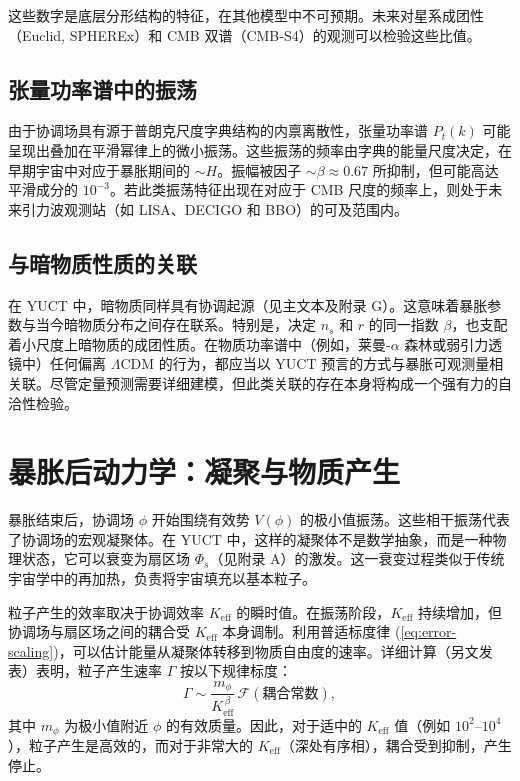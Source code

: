 \documentclass[11pt,a4paper]{article}
\newcommand{\Keff}{K_{\mathrm{eff}}}
\begin{document}
	这些数字是底层分形结构的特征，在其他模型中不可预期。未来对星系成团性（Euclid, SPHEREx）和 CMB 双谱（CMB‑S4）的观测可以检验这些比值。
	
	\subsection{张量功率谱中的振荡}
	
	由于协调场具有源于普朗克尺度字典结构的内禀离散性，张量功率谱 \(P_t(k)\) 可能呈现出叠加在平滑幂律上的微小振荡。这些振荡的频率由字典的能量尺度决定，在早期宇宙中对应于暴胀期间的 \(\sim H\)。振幅被因子 \(\sim \beta \approx 0.67\) 所抑制，但可能高达平滑成分的 \(10^{-3}\)。若此类振荡特征出现在对应于 CMB 尺度的频率上，则处于未来引力波观测站（如 LISA、DECIGO 和 BBO）的可及范围内。
	
	\subsection{与暗物质性质的关联}
	
	在 YUCT 中，暗物质同样具有协调起源（见主文本及附录 G）。这意味着暴胀参数与当今暗物质分布之间存在联系。特别是，决定 \(n_s\) 和 \(r\) 的同一指数 \(\beta\)，也支配着小尺度上暗物质的成团性质。在物质功率谱中（例如，莱曼-\(\alpha\) 森林或弱引力透镜中）任何偏离 \(\Lambda\)CDM 的行为，都应当以 YUCT 预言的方式与暴胀可观测量相关联。尽管定量预测需要详细建模，但此类关联的存在本身将构成一个强有力的自洽性检验。
	
	\section{暴胀后动力学：凝聚与物质产生}
	\label{sec:postinflation}
	
	暴胀结束后，协调场 \(\phi\) 开始围绕有效势 \(V(\phi)\) 的极小值振荡。这些相干振荡代表了协调场的宏观凝聚体。在 YUCT 中，这样的凝聚体不是数学抽象，而是一种物理状态，它可以衰变为扇区场 \(\Phi_s\)（见附录 A）的激发。这一衰变过程类似于传统宇宙学中的再加热，负责将宇宙填充以基本粒子。
	
	粒子产生的效率取决于协调效率 \(\Keff\) 的瞬时值。在振荡阶段，\(\Keff\) 持续增加，但协调场与扇区场之间的耦合受 \(\Keff\) 本身调制。利用普适标度律 (\ref{eq:error-scaling})，可以估计能量从凝聚体转移到物质自由度的速率。详细计算（另文发表）表明，粒子产生速率 \(\Gamma\) 按以下规律标度：
	\begin{equation}
		\Gamma \sim \frac{m_\phi}{\Keff^{\,\beta}} \, \mathcal{F}(\text{耦合常数}),
		\label{eq:gamma}
	\end{equation}
	其中 \(m_\phi\) 为极小值附近 \(\phi\) 的有效质量。因此，对于适中的 \(\Keff\) 值（例如 \(10^2\)–\(10^4\)），粒子产生是高效的，而对于非常大的 \(\Keff\)（深处有序相），耦合受到抑制，产生停止。
	
\end{document}
